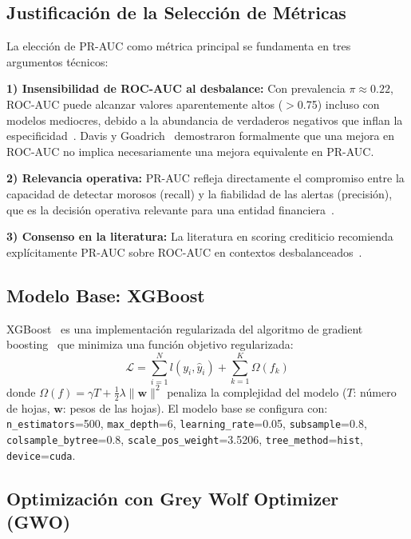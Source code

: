 \documentclass[journal]{IEEEtran}
\begin{document}
\subsection{Justificación de la Selección de Métricas}
La elección de PR-AUC como métrica principal se fundamenta en tres argumentos técnicos:

\textbf{1) Insensibilidad de ROC-AUC al desbalance:} Con prevalencia $\pi \approx 0.22$, ROC-AUC puede alcanzar valores aparentemente altos ($>$0.75) incluso con modelos mediocres, debido a la abundancia de verdaderos negativos que inflan la especificidad~\cite{saito2015}. Davis y Goadrich~\cite{davis2006} demostraron formalmente que una mejora en ROC-AUC no implica necesariamente una mejora equivalente en PR-AUC.

\textbf{2) Relevancia operativa:} PR-AUC refleja directamente el compromiso entre la capacidad de detectar morosos (recall) y la fiabilidad de las alertas (precisión), que es la decisión operativa relevante para una entidad financiera~\cite{hand1997, thomas2000}.

\textbf{3) Consenso en la literatura:} La literatura en scoring crediticio recomienda explícitamente PR-AUC sobre ROC-AUC en contextos desbalanceados~\cite{lessmann2015, he2009, saito2015}.

\subsection{Modelo Base: XGBoost}
\label{sec:base}

XGBoost~\cite{chen2016} es una implementación regularizada del algoritmo de gradient boosting~\cite{friedman2001} que minimiza una función objetivo regularizada:
\begin{equation}
    \mathcal{L} = \sum_{i=1}^{N} l(y_i, \hat{y}_i) + \sum_{k=1}^{K} \Omega(f_k)
    \label{eq:xgb_obj}
\end{equation}
donde $\Omega(f) = \gamma T + \frac{1}{2}\lambda \|\mathbf{w}\|^2$ penaliza la complejidad del modelo ($T$: número de hojas, $\mathbf{w}$: pesos de las hojas). El modelo base se configura con: \texttt{n\_estimators}=500, \texttt{max\_depth}=6, \texttt{learning\_rate}=0.05, \texttt{subsample}=0.8, \texttt{colsample\_bytree}=0.8, \texttt{scale\_pos\_weight}=3.5206, \texttt{tree\_method}=\texttt{hist}, \texttt{device}=\texttt{cuda}.

\subsection{Optimización con Grey Wolf Optimizer (GWO)}
\label{sec:gwo}
\end{document}
